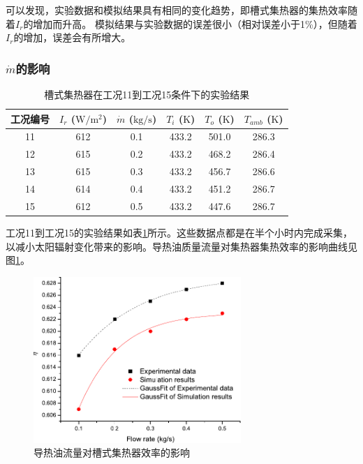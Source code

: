 可以发现，实验数据和模拟结果具有相同的变化趋势，即槽式集热器的集热效率随着$I_r$的增加而升高。
模拟结果与实验数据的误差很小（相对误差小于1\%），但随着$I_r$的增加，误差会有所增大。

\subsubsection{$\dot{m}$的影响}

\begin{table}[htbp]\footnotesize
\setlength{\abovecaptionskip}{-10pt}
	\caption{槽式集热器在工况11到工况15条件下的实验结果}
	\begin{center}
	\begin{tabular}{cccccc}
		\toprule
		工况编号	& $I_r$ ($\mathrm{W/m^2}$)	&	$\dot{m}$ ($\mathrm{kg/s}$)			&	$T_i$ ($\mathrm{K}$)	&	$T_o$ ($\mathrm{K}$)		&	$T_{amb}$ ($\mathrm{K}$)\\
		\midrule
		11	&	612	&	0.1	&	433.2	&	501.0	&	286.3\\
		12	&	615	&	0.2	&	433.2	&	468.2	&	286.4\\
		13	&	615	&	0.3	&	433.2	&	456.7	&	286.6	\\
		14	&	614	&	0.4	&	433.2	&	451.2	&	286.7\\
		15	&	612	&	0.5	&	433.2	&	447.6	&	286.7\\
		\bottomrule
	\end{tabular}
	\end{center}
	\label{tab:ResultOfTrough2}
\end{table}
工况11到工况15的实验结果如表\ref{tab:ResultOfTrough2}所示。这些数据点都是在半个小时内完成采集，以减小太阳辐射变化带来的影响。导热油质量流量对集热器集热效率的影响曲线见图\ref{fig:q_m-eta-trough}。

\begin{figure}[!ht]
\centering
\includegraphics[width=0.7\textwidth]{fig/q_m-eta-trough}
\caption{导热油流量对槽式集热器效率的影响}
\label{fig:q_m-eta-trough}
\end{figure}

